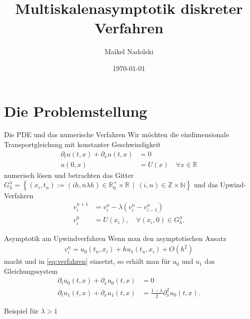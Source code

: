 \documentclass{beamer}
\title{Multiskalenasymptotik diskreter Verfahren}
\date{\today}
\author{Maikel Nadolski}
\institute{Freie Universität Berlin}
\newcommand{\R}{\mathbb R}
\newcommand{\Rp}{\mathbb R^+_0}
\newcommand{\N}{\mathbb N}
\newcommand{\Z}{\mathbb Z}
\begin{document}
  \maketitle
  \section{Die Problemstellung}

  \begin{frame}{Die PDE und das numerische Verfahren}
    Wir möchten die eindimensionale Transportgleichung mit konstanter 
    Geschwindigkeit
    \begin{align}\label{eq:pde}
      \partial_t u(t,x) + \partial_x u(t,x) &= 0\\
      u(0,x) &= U(x) \quad \forall x \in \R
    \end{align}
    numerisch lösen und betrachten das Gitter
    $G^\lambda_h = \left\{ (x_i, t_n) := (ih, n \lambda h) \in \Rp \times \R \, \mid \, (i,n) \in \Z \times \N \right\}$
    und das Upwind-Verfahren
    \begin{align}\label{eq:verfahren}
      v^{n+1}_i &= v^n_i - \lambda ( v^n_i - v^n_{i-1} )\\
      v^0_i &= U(x_i), \quad \forall (x_i, 0) \in G^\lambda_h.
    \end{align}
  \end{frame}

  \begin{frame}{Asymptotik am Upwindverfahren}
    Wenn man den asymptotischen Ansatz 
    \begin{align}
      v^n_i = u_0(t_n, x_i) + h u_1(t_n, x_i) + O(h^2)
    \end{align}
    macht und in \eqref{eq:verfahren} einsetzt, so erhält man für $u_0$ und $u_1$
    das Gleichungssystem
    \begin{align}
      \partial_t u_0(t, x) + \partial_x u_0(t, x) &= 0\\
      \partial_t u_1(t, x) + \partial_x u_1(t, x) &= \frac{1 - \lambda}{2} \partial^2_x u_0(t, x).
    \end{align}
  \end{frame}

  \begin{frame}{Beispiel für $\lambda > 1$}

  \end{frame}
\end{document}
